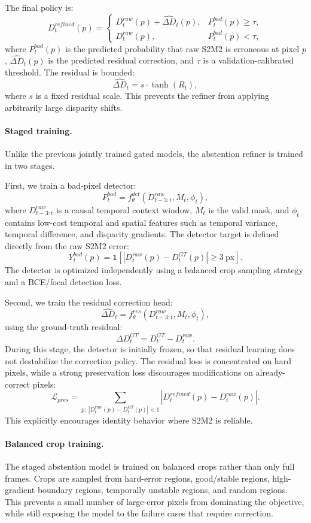 \documentclass[11pt,a4paper]{article}
\begin{document}
The final policy is:
\[
D_t^{refined}(p)
=
\begin{cases}
D_t^{raw}(p) + \widehat{\Delta D}_t(p),
&
P_t^{bad}(p) \geq \tau, \\
D_t^{raw}(p),
&
P_t^{bad}(p) < \tau,
\end{cases}
\]
where \(P_t^{bad}(p)\) is the predicted probability that raw S2M2 is erroneous at
pixel \(p\), \(\widehat{\Delta D}_t(p)\) is the predicted residual correction,
and \(\tau\) is a validation-calibrated threshold. The residual is bounded:
\[
\widehat{\Delta D}_t = s \cdot \tanh(R_t),
\]
where \(s\) is a fixed residual scale. This prevents the refiner from applying
arbitrarily large disparity shifts.

\paragraph{Staged training.}
Unlike the previous jointly trained gated models, the abstention refiner is
trained in two stages.

First, we train a bad-pixel detector:
\[
P_t^{bad}
=
f_{\theta}^{det}
\left(
D_{t-3:t}^{raw}, M_t, \phi_t
\right),
\]
where \(D_{t-3:t}^{raw}\) is a causal temporal context window, \(M_t\) is the
valid mask, and \(\phi_t\) contains low-cost temporal and spatial features such
as temporal variance, temporal difference, and disparity gradients. The detector
target is defined directly from the raw S2M2 error:
\[
Y_t^{bad}(p)
=
\mathbb{1}
\left[
|D_t^{raw}(p) - D_t^{GT}(p)| \geq 3~\mathrm{px}
\right].
\]
The detector is optimized independently using a balanced crop sampling strategy
and a BCE/focal detection loss.

Second, we train the residual correction head:
\[
\widehat{\Delta D}_t
=
f_{\theta}^{res}
\left(
D_{t-3:t}^{raw}, M_t, \phi_t
\right),
\]
using the ground-truth residual:
\[
\Delta D_t^{GT} = D_t^{GT} - D_t^{raw}.
\]
During this stage, the detector is initially frozen, so that residual learning
does not destabilize the correction policy. The residual loss is concentrated on
hard pixels, while a strong preservation loss discourages modifications on
already-correct pixels:
\[
\mathcal{L}_{pres}
=
\sum_{p:\ |D_t^{raw}(p)-D_t^{GT}(p)|<1}
\left|
D_t^{refined}(p) - D_t^{raw}(p)
\right|.
\]
This explicitly encourages identity behavior where S2M2 is reliable.

\paragraph{Balanced crop training.}
The staged abstention model is trained on balanced crops rather than only full
frames. Crops are sampled from hard-error regions, good/stable regions,
high-gradient boundary regions, temporally unstable regions, and random regions.
This prevents a small number of large-error pixels from dominating the objective,
while still exposing the model to the failure cases that require correction.
\end{document}
